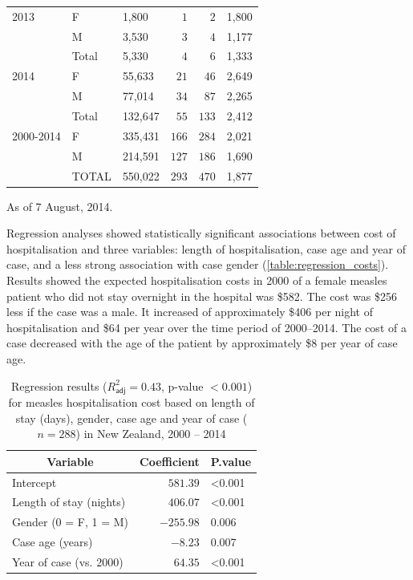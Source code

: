 \documentclass{article}
\begin{document}
\begin{table}
\begin{center}
\begin{tabular}{lllrrl}
2013&F&1,800&$  1$&$  2$&1,800\tabularnewline
&M&3,530&$  3$&$  4$&1,177\tabularnewline
                    &Total&5,330&$  4$&$  6$&1,333\tabularnewline
2014&F&55,633&$ 21$&$ 46$&2,649\tabularnewline
&M&77,014&$ 34$&$ 87$&2,265\tabularnewline
&Total&132,647&$ 55$&$133$&2,412\tabularnewline
2000-2014&      F&335,431&$166$&$284$&2,021\tabularnewline
&     M&214,591&$127$&$186$&1,690\tabularnewline
&TOTAL&550,022&$293$&$470$&1,877\tabularnewline
\hline
\end{tabular}\end{center}\label{table:cases}
 \centering
 \begin{tablenotes}
      \small
      \item As of 7 August, 2014.
    \end{tablenotes}
\end{table}

Regression analyses showed statistically significant associations between cost of hospitalisation and three variables: length of hospitalisation, case age and year of case, and a less strong association with case gender (\autoref{table:regression_costs}). Results showed the expected hospitalisation costs in 2000 of a female measles patient who did not stay overnight in the hospital was \$582.  The cost was \$256 less if the case was a male. It increased of approximately \$406 per night of hospitalisation and \$64 per year over the time period of 2000--2014. The cost of a case decreased with the age of the patient by approximately \$8 per year of case age.


\begin{table}
\caption{Regression results ($R^{2}_\textsf{adj} = 0.43$, p-value $<0.001$) for measles hospitalisation cost based on length of stay (days), gender, case age and year of case ($n=288$) in New Zealand, 2000 -- 2014}
\begin{center}
\begin{tabular}{lrl}
\hline\hline
\multicolumn{1}{c}{Variable}&\multicolumn{1}{c}{Coefficient}&\multicolumn{1}{c}{P.value}\tabularnewline
\hline
Intercept&$ 581.39$&\textless  0.001\tabularnewline
Length of stay (nights)&$ 406.07$&\textless  0.001\tabularnewline
Gender (0 = F, 1 = M)&$-255.98$&0.006\tabularnewline
Case age (years)&$  -8.23$&0.007\tabularnewline
Year of case (vs. 2000)&$  64.35$&\textless  0.001\tabularnewline
\hline
\end{tabular}\end{center}\label{table:regression_costs}
\end{table}
\end{document}
